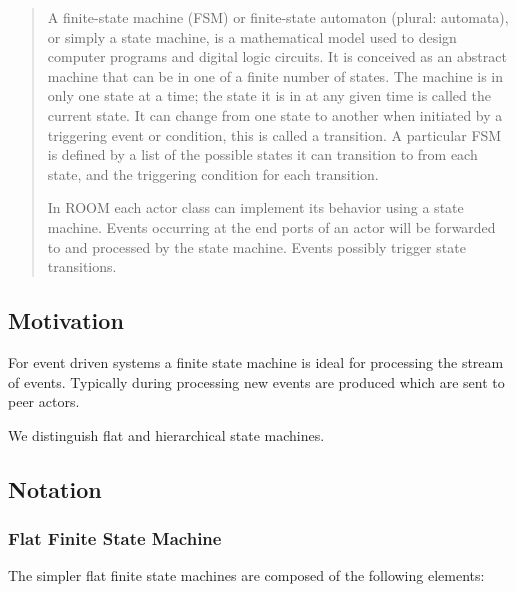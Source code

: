 \begin{quote}
A finite-state machine (FSM) or finite-state automaton (plural: automata), or simply a state machine, is a 
mathematical model used to design computer programs and digital logic circuits. It is conceived as an 
abstract machine that can be in one of a finite number of states. The machine is in only one state at a 
time; the state it is in at any given time is called the current state. It can change from one state to 
another when initiated by a triggering event or condition, this is called a transition. A particular FSM 
is defined by a list of the possible states it can transition to from each state, and the triggering 
condition for each transition.

In ROOM each actor class can implement its behavior using a state machine. Events occurring at the end 
ports of an actor will be forwarded to and processed by the state machine. Events possibly trigger state 
transitions.
\end{quote}

\subsection{Motivation}

For event driven systems a finite state machine is ideal for processing the stream of events. Typically 
during processing new events are produced which are sent to peer actors.

We distinguish flat and hierarchical state machines.

\subsection{Notation}

\subsubsection{Flat Finite State Machine}

The simpler flat finite state machines are composed of the following elements:

